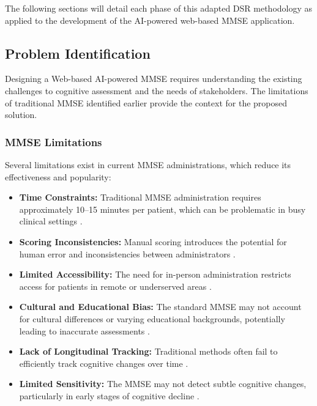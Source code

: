 The following sections will detail each phase of this adapted DSR methodology as applied to the development of the AI-powered web-based MMSE application.

\subsection{Problem Identification}

Designing a Web-based AI-powered MMSE requires understanding the existing challenges to cognitive assessment and the needs of stakeholders. The limitations of traditional MMSE identified earlier provide the context for the proposed solution.

\subsubsection{MMSE Limitations}

Several limitations exist in current MMSE administrations, which reduce its effectiveness and popularity:

\begin{itemize}
    \item \textbf{Time Constraints:} Traditional MMSE administration requires approximately 10–15 minutes per patient, which can be problematic in busy clinical settings \cite{Folstein1975}.
    
    \item \textbf{Scoring Inconsistencies:} Manual scoring introduces the potential for human error and inconsistencies between administrators \cite{Tombaugh1992}.
    
    \item \textbf{Limited Accessibility:} The need for in-person administration restricts access for patients in remote or underserved areas \cite{Bauer2012}.
    
    \item \textbf{Cultural and Educational Bias:} The standard MMSE may not account for cultural differences or varying educational backgrounds, potentially leading to inaccurate assessments \cite{Cullen2007}.
    
    \item \textbf{Lack of Longitudinal Tracking:} Traditional methods often fail to efficiently track cognitive changes over time \cite{Goldberg2015}.
    
    \item \textbf{Limited Sensitivity:} The MMSE may not detect subtle cognitive changes, particularly in early stages of cognitive decline \cite{Mitchell2009}.
\end{itemize}

